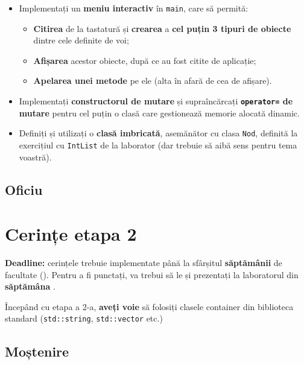 \begin{itemize}
    \item Implementați un \textbf{meniu interactiv} în \texttt{main}, care să permită:
    \begin{itemize}
        \item \textbf{Citirea} de la tastatură și \textbf{crearea} a \textbf{cel puțin 3 tipuri de obiecte} dintre cele definite de voi;
        \item \textbf{Afișarea} acestor obiecte, după ce au fost citite de aplicație;
        \item \textbf{Apelarea unei metode} pe ele (alta în afară de cea de afișare).
    \end{itemize}
    
    \item Implementați \textbf{constructorul de mutare} și supraîncărcați \textbf{\texttt{operator=} de mutare} pentru cel puțin o clasă care gestionează memorie alocată dinamic.
    
    \item Definiți și utilizați o \textbf{clasă imbricată}, asemănător cu clasa \texttt{Nod}, definită la exercițiul cu \texttt{IntList} de la laborator (dar trebuie să aibă sens pentru tema voastră).
\end{itemize}

\subsection*{Oficiu}

\newpage

\section*{Cerințe etapa 2} \label{phase2}

\textbf{Deadline:} cerințele trebuie implementate până la sfârșitul \textbf{săptămânii \phasetwodeadlineweek} de facultate (\textbf{\phasetwodeadlinedate}). Pentru a fi punctați, va trebui să le și prezentați la laboratorul din \textbf{săptămâna \phasetwopresentationweek}.

Începând cu etapa a 2-a, \textbf{aveți voie} să folosiți clasele container din biblioteca standard (\texttt{std::string}, \texttt{std::vector} etc.)

\subsection*{Moștenire}

